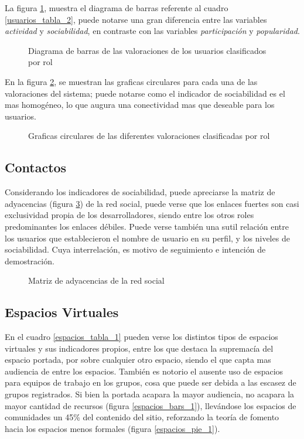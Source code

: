 La figura \ref{usuarios_bars_2}, muestra el diagrama de barras referente al
cuadro \ref{usuarios_tabla_2}, puede notarse una gran diferencia entre las
variables \emph{actividad} y \emph{sociabilidad}, en contraste con las variables
\emph{participación} y \emph{popularidad}.

\begin{figure}
\centering

\caption{Diagrama de barras de las valoraciones de los usuarios clasificados por
rol}
\label{usuarios_bars_2}
\end{figure}

En la figura \ref{usuarios_pie_2}, se muestran las graficas circulares para cada
una de las valoraciones del sistema; puede notarse como el indicador de
sociabilidad es el mas homogéneo, lo que augura una conectividad mas que
deseable para los usuarios.

\begin{figure}
\centering

\caption{Graficas circulares de las diferentes valoraciones clasificadas por
rol}
\label{usuarios_pie_2}
\end{figure}

\subsection{Contactos}
Considerando los indicadores de sociabilidad, puede apreciarse la matriz de
adyacencias (figura \ref{contactos_matriz}) de la red social, puede verse que
los enlaces fuertes son casi exclusividad propia de los desarrolladores, siendo
entre los otros roles predominantes los enlaces débiles. Puede verse también
una sutil relación entre los usuarios que establecieron el nombre de usuario en
su perfil, y los niveles de sociabilidad. Cuya interrelación, es motivo de
seguimiento e intención de demostración.

\begin{figure}
\centering

\caption{Matriz de adyacencias de la red social}
\label{contactos_matriz}
\end{figure}

\subsection{Espacios Virtuales}
En el cuadro \ref{espacios_tabla_1} pueden verse los distintos tipos de
espacios virtuales y sus indicadores propios, entre los que destaca la
supremacía del espacio portada, por sobre cualquier otro espacio, siendo el que 
capta mas audiencia de entre los espacios. También es notorio el ausente uso de
espacios para equipos de trabajo en los grupos, cosa que puede ser debida a las
escasez de grupos registrados. Si bien la portada acapara la mayor audiencia,
no acapara la mayor cantidad de recursos (figura \ref{espacios_bars_1}),
llevándose los espacios de comunidades un 45\% del contenido del sitio, 
reforzando la teoría de fomento hacia los espacios menos formales (figura
\ref{espacios_pie_1}).

